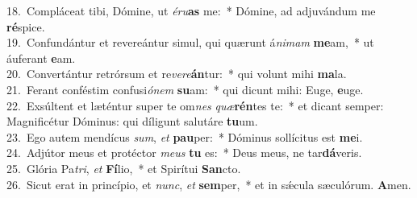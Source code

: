 {18.~}Compláceat tibi, Dómine, ut \textit{é}\textit{ru}\textbf{as} me:~* Dómine, ad adjuvándum me \textbf{ré}spice.\\
{19.~}Confundántur et revereántur simul, qui quærunt á\textit{ni}\textit{mam} \textbf{me}am,~* ut áuferant \textbf{e}am.\\
{20.~}Convertántur retrórsum et re\textit{ve}\textit{re}\textbf{án}tur:~* qui volunt mihi \textbf{ma}la.\\
{21.~}Ferant conféstim confusi\textit{ó}\textit{nem} \textbf{su}am:~* qui dicunt mihi: Euge, \textbf{e}uge.\\
{22.~}Exsúltent et læténtur super te om\textit{nes} \textit{quæ}\textbf{rén}tes te:~* et dicant semper: Magnificétur Dóminus: qui díligunt salutáre \textbf{tu}um.\\
{23.~}Ego autem mendícus \textit{sum}, \textit{et} \textbf{pau}per:~* Dóminus sollícitus est \textbf{me}i.\\
{24.~}Adjútor meus et protéctor \textit{me}\textit{us} \textbf{tu} es:~* Deus meus, ne tar\textbf{dá}veris.\\
{25.~}Glória Pa\textit{tri}, \textit{et} \textbf{Fí}lio,~* et Spirítui \textbf{San}cto.\\
{26.~}Sicut erat in princípio, et \textit{nunc}, \textit{et} \textbf{sem}per,~* et in sǽcula sæculórum. \textbf{A}men.\\
